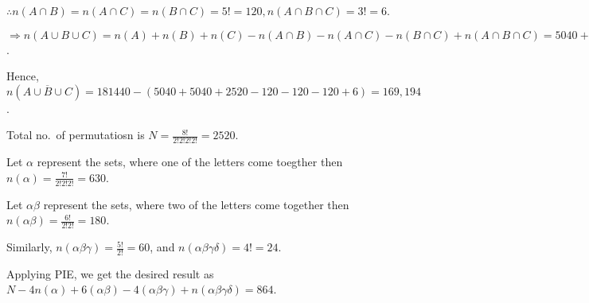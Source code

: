   $\therefore n(A\cap B) = n(A\cap C) = n(B\cap C) = 5! = 120, n(A\cap B\cap C) = 3!= 6$.

  $\Rightarrow n(A\cup B\cup C) = n(A) + n(B) + n(C) - n(A\cap B) - n(A\cap C) - n(B\cap C) + n(A\cap B\cap
  C) = 5040 + 5040 + 2520 − 120 − 120 − 120 + 6$.

  Hence, $n(\overline{A\cup B\cup C}) = 181440 - (5040 + 5040 + 2520 − 120 − 120 − 120 + 6) = 169,194$.
\item Total no.\ of permutatiosn is $N = \frac{8!}{2!2!2!2!} = 2520$.

  Let $\alpha$ represent the sets, where one of the letters come toegther then $n(\alpha) =
  \frac{7!}{2!2!2!} = 630$.

  Let $\alpha\beta$ represent the sets, where two of the letters come together then $n(\alpha\beta) =
  \frac{6!}{2!2!} = 180$.

  Similarly, $n(\alpha\beta\gamma) = \frac{5!}{2!} = 60$, and $n(\alpha\beta\gamma\delta) = 4! = 24$.

  Applying PIE, we get the desired result as $N - 4n(\alpha) + 6(\alpha\beta) - 4(\alpha\beta\gamma) +
  n(\alpha\beta\gamma\delta) = 864$.
\stopitemize
